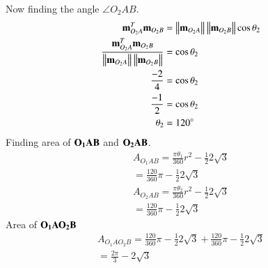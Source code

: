 \documentclass[journal,12pt,twocolumn]{IEEEtran}
\begin{document}
Now finding the angle $\angle{O_2AB}$.
\begin{align}
\mathbf{m}_{O_2A}^T \mathbf{m}_{O_2B}&=\left\lVert \mathbf{m}_{O_2A}\right\rVert\left\lVert\mathbf{m}_{O_2B}\right\rVert\cos\theta_2\\
\frac{\mathbf{m}_{O_2A}^T \mathbf{m}_{O_2B}}{\left\lVert \mathbf{m}_{O_2A}\right\rVert\left\lVert\mathbf{m}_{O_2B}\right\rVert}&=\cos\theta_2\\
\frac{-2}{4}&=\cos\theta_2\\
\frac{-1}{2}&=\cos\theta_2\\
\theta_2&=120^{\circ}
\end{align}
Finding area of $\bf{O_1AB}$ and $\bf{O_2AB}$.
 \begin{align}
A_{O_1AB}=\frac{\pi\theta_1}{360}r^2-\frac{1}{2}2\sqrt{3}\\
=\frac{120}{360}\pi-\frac{1}{2}2\sqrt{3}\\
A_{O_2AB}=\frac{\pi\theta_2}{360}r^2-\frac{1}{2}2\sqrt{3}\\
=\frac{120}{360}\pi-\frac{1}{2}2\sqrt{3}
\end{align}
Area of  $\bf{O_1AO_2B}$
\begin{align}
A_{O_1AO_2B}=\frac{120}{360}\pi-\frac{1}{2}2\sqrt{3}+\frac{120}{360}\pi-\frac{1}{2}2\sqrt{3}\\
=\frac{2\pi}{3}-2\sqrt{3}
\end{align}
\end{document}
